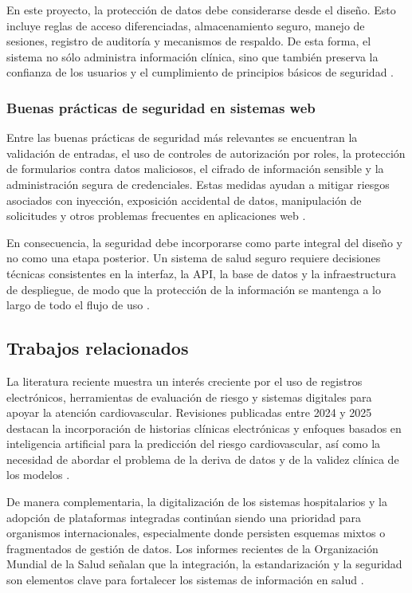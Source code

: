 En este proyecto, la protección de datos debe considerarse desde el diseño. Esto incluye reglas de acceso diferenciadas, almacenamiento seguro, manejo de sesiones, registro de auditoría y mecanismos de respaldo. De esta forma, el sistema no sólo administra información clínica, sino que también preserva la confianza de los usuarios y el cumplimiento de principios básicos de seguridad \cite{mdn2025security,owasp2025top10}.

\subsubsection{Buenas prácticas de seguridad en sistemas web}

Entre las buenas prácticas de seguridad más relevantes se encuentran la validación de entradas, el uso de controles de autorización por roles, la protección de formularios contra datos maliciosos, el cifrado de información sensible y la administración segura de credenciales. Estas medidas ayudan a mitigar riesgos asociados con inyección, exposición accidental de datos, manipulación de solicitudes y otros problemas frecuentes en aplicaciones web \cite{owasp2025top10,mdn2025security}.

En consecuencia, la seguridad debe incorporarse como parte integral del diseño y no como una etapa posterior. Un sistema de salud seguro requiere decisiones técnicas consistentes en la interfaz, la API, la base de datos y la infraestructura de despliegue, de modo que la protección de la información se mantenga a lo largo de todo el flujo de uso \cite{owasp2025top10,mdn2025privacy}.

\subsection{Trabajos relacionados}

La literatura reciente muestra un interés creciente por el uso de registros electrónicos, herramientas de evaluación de riesgo y sistemas digitales para apoyar la atención cardiovascular. Revisiones publicadas entre 2024 y 2025 destacan la incorporación de historias clínicas electrónicas y enfoques basados en inteligencia artificial para la predicción del riesgo cardiovascular, así como la necesidad de abordar el problema de la deriva de datos y de la validez clínica de los modelos \cite{tsai2025ehrai,bibi2025cdrisk}.

De manera complementaria, la digitalización de los sistemas hospitalarios y la adopción de plataformas integradas continúan siendo una prioridad para organismos internacionales, especialmente donde persisten esquemas mixtos o fragmentados de gestión de datos. Los informes recientes de la Organización Mundial de la Salud señalan que la integración, la estandarización y la seguridad son elementos clave para fortalecer los sistemas de información en salud \cite{who2024digitalization,who2025digitalhealth2027}.

